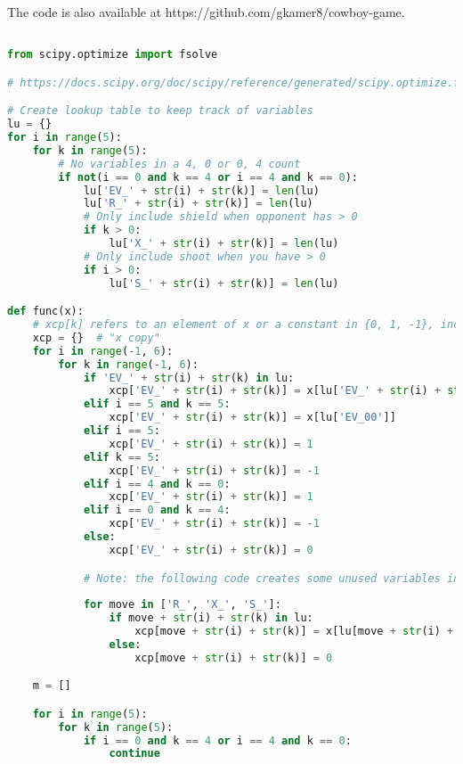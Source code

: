 \documentclass[11pt]{article}
\begin{document}
The code is also available at https://github.com/gkamer8/cowboy-game.

\fontsize{7}{12}\selectfont

\begin{lstlisting}[language=Python]

from scipy.optimize import fsolve

# https://docs.scipy.org/doc/scipy/reference/generated/scipy.optimize.fsolve.html#scipy.optimize.fsolve

# Create lookup table to keep track of variables
lu = {} 
for i in range(5):
    for k in range(5):
        # No variables in a 4, 0 or 0, 4 count
        if not(i == 0 and k == 4 or i == 4 and k == 0):
            lu['EV_' + str(i) + str(k)] = len(lu)
            lu['R_' + str(i) + str(k)] = len(lu)
            # Only include shield when opponent has > 0
            if k > 0:
                lu['X_' + str(i) + str(k)] = len(lu)
            # Only include shoot when you have > 0
            if i > 0:
                lu['S_' + str(i) + str(k)] = len(lu)

def func(x):
    # xcp[k] refers to an element of x or a constant in {0, 1, -1}, including all combos ([0-6), [0-6))
    xcp = {}  # "x copy"
    for i in range(-1, 6):
        for k in range(-1, 6):
            if 'EV_' + str(i) + str(k) in lu:
                xcp['EV_' + str(i) + str(k)] = x[lu['EV_' + str(i) + str(k)]]
            elif i == 5 and k == 5:
                xcp['EV_' + str(i) + str(k)] = x[lu['EV_00']]
            elif i == 5:
                xcp['EV_' + str(i) + str(k)] = 1
            elif k == 5:
                xcp['EV_' + str(i) + str(k)] = -1
            elif i == 4 and k == 0:
                xcp['EV_' + str(i) + str(k)] = 1
            elif i == 0 and k == 4:
                xcp['EV_' + str(i) + str(k)] = -1
            else:
                xcp['EV_' + str(i) + str(k)] = 0

            # Note: the following code creates some unused variables in counts containing 5
            
            for move in ['R_', 'X_', 'S_']:
                if move + str(i) + str(k) in lu:
                    xcp[move + str(i) + str(k)] = x[lu[move + str(i) + str(k)]]
                else:
                    xcp[move + str(i) + str(k)] = 0

    m = []

    for i in range(5):
        for k in range(5):
            if i == 0 and k == 4 or i == 4 and k == 0:
                continue


\end{lstlisting}
\end{document}
